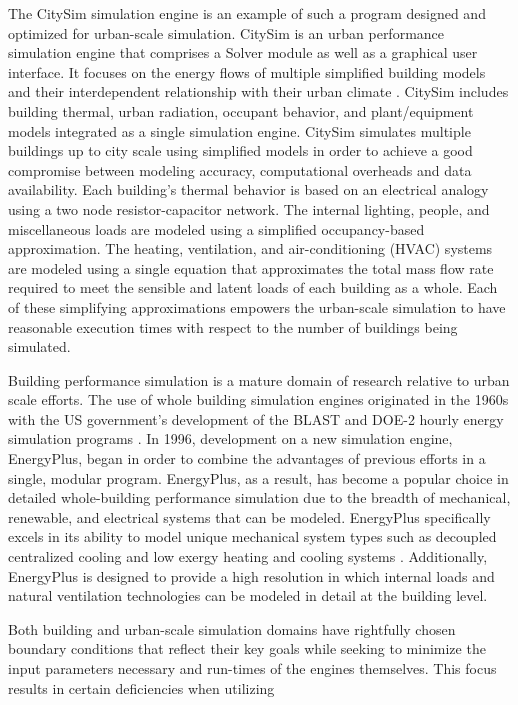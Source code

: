 \documentclass{tBPS2e}
\theoremstyle{plain}
\theoremstyle{definition}
\theoremstyle{remark}
\begin{document}
The CitySim simulation engine is an example of such a program designed and optimized for urban-scale simulation. CitySim is an urban performance simulation engine that comprises a Solver module as well as a graphical user interface. It focuses on the energy flows of multiple simplified building models and their interdependent relationship with their urban climate \citep{Robinson:2009tm}. CitySim includes building thermal, urban radiation, occupant behavior, and plant/equipment models integrated as a single simulation engine. CitySim simulates multiple buildings up to city scale using simplified models in order to achieve a good compromise between modeling accuracy, computational overheads and data availability. Each building's thermal behavior is based on an electrical analogy using a two node resistor-capacitor network. The internal lighting, people, and miscellaneous loads are modeled using a simplified occupancy-based approximation. The heating, ventilation, and air-conditioning (HVAC) systems are modeled using a single equation that approximates the total mass flow rate required to meet the sensible and latent loads of each building as a whole. Each of these simplifying approximations empowers the urban-scale simulation to have reasonable execution times with respect to the number of buildings being simulated.

Building performance simulation is a mature domain of research relative to urban scale efforts. The use of whole building simulation engines originated in the 1960s with the US government's development of the BLAST and DOE-2 hourly energy simulation programs \cite{Lawrie:2001vf}. In 1996, development on a new simulation engine, EnergyPlus, began in order to combine the advantages of previous efforts in a single, modular program. EnergyPlus, as a result, has become a popular choice in detailed whole-building performance simulation due to the breadth of mechanical, renewable, and electrical systems that can be modeled. EnergyPlus specifically excels in its ability to model unique mechanical system types such as decoupled centralized cooling \cite{Miller:2010wa} and low exergy heating and cooling systems \cite{barbara:2015tz}. Additionally, EnergyPlus is designed to provide a high resolution in which internal loads and natural ventilation technologies can be modeled in detail at the building level.  

Both building and urban-scale simulation domains have rightfully chosen boundary conditions that reflect their key goals while seeking to minimize the input parameters necessary and run-times of the engines themselves. This focus results in certain deficiencies when utilizing
\end{document}
